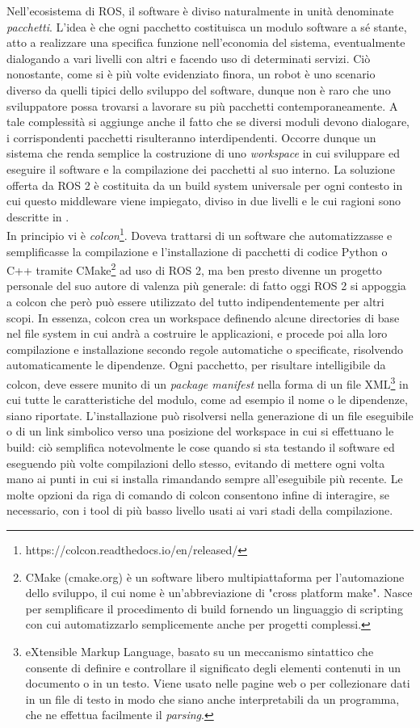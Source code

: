 \indent Nell'ecosistema di ROS, il software è diviso naturalmente in unità denominate \emph{pacchetti}. L'idea è che ogni pacchetto costituisca un modulo software a sé stante, atto a realizzare una specifica funzione nell'economia del sistema, eventualmente dialogando a vari livelli con altri e facendo uso di determinati servizi. Ciò nonostante, come si è più volte evidenziato finora, un robot è uno scenario diverso da quelli tipici dello sviluppo del software, dunque non è raro che uno sviluppatore possa trovarsi a lavorare su più pacchetti contemporaneamente. A tale complessità si aggiunge anche il fatto che se diversi moduli devono dialogare, i corrispondenti pacchetti risulteranno interdipendenti. Occorre dunque un sistema che renda semplice la costruzione di uno \emph{workspace} in cui sviluppare ed eseguire il software e la compilazione dei pacchetti al suo interno. La soluzione offerta da ROS 2 è costituita da un build system universale per ogni contesto in cui questo middleware viene impiegato, diviso in due livelli e le cui ragioni sono descritte in \cite{ros2_build}.\\
In principio vi è \emph{colcon}\footnote{https://colcon.readthedocs.io/en/released/}. Doveva trattarsi di un software che automatizzasse e semplificasse la compilazione e l'installazione di pacchetti di codice Python o C++ tramite CMake\footnote{CMake (cmake.org) è un software libero multipiattaforma per l'automazione dello sviluppo, il cui nome è un'abbreviazione di "cross platform make". Nasce per semplificare il procedimento di build fornendo un linguaggio di scripting con cui automatizzarlo semplicemente anche per progetti complessi.} ad uso di ROS 2, ma ben presto divenne un progetto personale del suo autore di valenza più generale: di fatto oggi ROS 2 si appoggia a colcon che però può essere utilizzato del tutto indipendentemente per altri scopi. In essenza, colcon crea un workspace definendo alcune directories di base nel file system in cui andrà a costruire le applicazioni, e procede poi alla loro compilazione e installazione secondo regole automatiche o specificate, risolvendo automaticamente le dipendenze. Ogni pacchetto, per risultare intelligibile da colcon, deve essere munito di un \emph{package manifest} nella forma di un file XML\footnote{eXtensible Markup Language, basato su un meccanismo sintattico che consente di definire e controllare il significato degli elementi contenuti in un documento o in un testo. Viene usato nelle pagine web o per collezionare dati in un file di testo in modo che siano anche interpretabili da un programma, che ne effettua facilmente il \emph{parsing}.} in cui tutte le caratteristiche del modulo, come ad esempio il nome o le dipendenze, siano riportate. L'installazione può risolversi nella generazione di un file eseguibile o di un link simbolico verso una posizione del workspace in cui si effettuano le build: ciò semplifica notevolmente le cose quando si sta testando il software ed eseguendo più volte compilazioni dello stesso, evitando di mettere ogni volta mano ai punti in cui si installa rimandando sempre all'eseguibile più recente. Le molte opzioni da riga di comando di colcon consentono infine di interagire, se necessario, con i tool di più basso livello usati ai vari stadi della compilazione.\\
